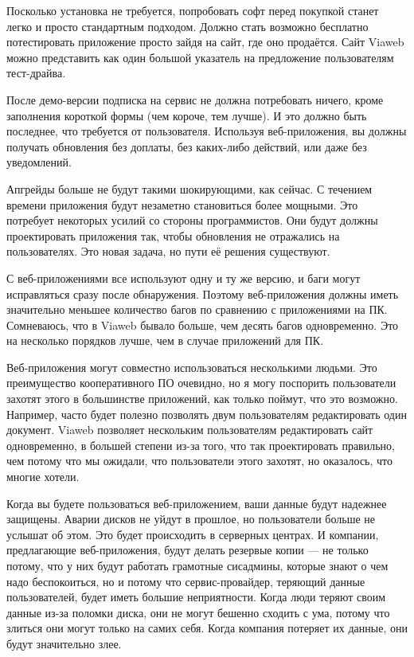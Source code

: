 \documentclass[ebook,12pt,oneside,openany]{memoir}
\begin{document}
Посколько установка не требуется, попробовать софт перед покупкой
станет легко и просто стандартным подходом. Должно стать возможно
бесплатно потестировать приложение просто зайдя на сайт, где оно
продаётся. Сайт Viaweb можно представить как один большой указатель на
предложение пользователям тест-драйва.

После демо-версии подписка на сервис не должна потребовать ничего,
кроме заполнения короткой формы (чем короче, тем лучше). И это должно
быть последнее, что требуется от пользователя. Используя
веб-приложения, вы должны получать обновления без доплаты, без
каких-либо действий, или даже без уведомлений.

Апгрейды больше не будут такими шокирующими, как сейчас. С течением
времени приложения будут незаметно становиться более мощными. Это
потребует некоторых усилий со стороны программистов. Они будут должны
проектировать приложения так, чтобы обновления не отражались на
пользователях. Это новая задача, но пути её решения существуют.

С веб-приложениями все используют одну и ту же версию, и баги могут
исправляться сразу после обнаружения. Поэтому веб-приложения должны
иметь значительно меньшее количество багов по сравнению с приложениями
на ПК. Сомневаюсь, что в Viaweb бывало больше, чем десять багов
одновременно. Это на несколько порядков лучше, чем в случае приложений
для ПК.

Веб-приложения могут совместно использоваться несколькими людьми. Это
преимущество кооперативного ПО очевидно, но я могу поспорить
пользователи захотят этого в большинстве приложений, как только
поймут, что это возможно. Например, часто будет полезно позволять двум
пользователям редактировать один документ. Viaweb позволяет нескольким
пользователям редактировать сайт одновременно, в большей степени из-за
того, что так проектировать правильно, чем потому что мы ожидали, что
пользователи этого захотят, но оказалось, что многие хотели.

Когда вы будете пользоваться веб-приложением, ваши данные будут
надежнее защищены. Аварии дисков не уйдут в прошлое, но пользователи
больше не услышат об этом. Это будет происходить в серверных центрах.
И компании, предлагающие веб-приложения, будут делать резервые копии —
не только потому, что у них будут работать грамотные сисадмины,
которые знают о чем надо беспокоиться, но и потому что
сервис-провайдер, теряющий данные пользователей, будет иметь большие
неприятности. Когда люди теряют своим данные из-за поломки диска, они
не могут бешенно сходить с ума, потому что злиться они могут только на
самих себя. Когда компания потеряет их данные, они будут значительно
злее.
\end{document}
